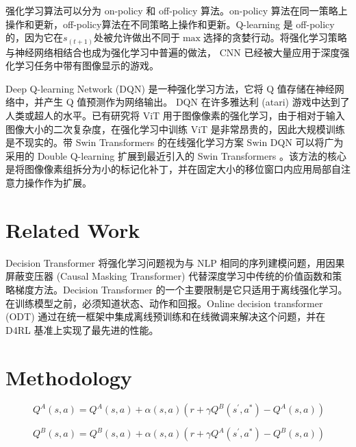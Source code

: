 \documentclass[final,1p,12pt,UTF8,review]{elsarticle}
\begin{document}
\par
强化学习算法可以分为 on-policy 和 off-policy 算法。on-policy 算法在同一策略上操作和更新，off-policy算法在不同策略上操作和更新。Q-learning 是 off-policy 的，因为它在$s_(t+1)$处被允许做出不同于$\max$选择的贪婪行动。将强化学习策略与神经网络相结合也成为强化学习中普遍的做法， CNN 已经被大量应用于深度强化学习任务中带有图像显示的游戏。

\par
Deep Q-learning Network (DQN) 是一种强化学习方法，它将 Q 值存储在神经网络中，并产生 Q 值预测作为网络输出。 DQN 在许多雅达利 (atari) 游戏中达到了人类或超人的水平。已有研究将 ViT 用于图像像素的强化学习，由于相对于输入图像大小的二次复杂度，在强化学习中训练 ViT 是非常昂贵的，因此大规模训练是不现实的。带 Swin Transformers 的在线强化学习方案 Swin DQN 可以将广为采用的 Double Q-learning 扩展到最近引入的 Swin Transformers 。该方法的核心是将图像像素组拆分为小的标记化补丁，并在固定大小的移位窗口内应用局部自注意力操作作为扩展。

\section{Related Work}
Decision Transformer 将强化学习问题视为与 NLP 相同的序列建模问题，用因果屏蔽变压器 (Causal Masking Transformer) 代替深度学习中传统的价值函数和策略梯度方法。Decision Transformer 的一个主要限制是它只适用于离线强化学习。在训练模型之前，必须知道状态、动作和回报。Online decision transformer (ODT) 通过在统一框架中集成离线预训练和在线微调来解决这个问题，并在 D4RL 基准上实现了最先进的性能。
\section{Methodology}

\begin{figure}[htp]
    \begin{equation}
        \label{eq:dqa}
        Q^A(s,a)=Q^A(s,a)+\alpha(s, a)(r+\gamma Q^B(s^{'},a^*)-Q^A(s,a))
    \end{equation}
\end{figure}

\begin{figure}[htp]
    \begin{equation}
        \label{eq:dqb}
        Q^B (s,a) = Q^B (s,a) + \alpha(s, a)(r+\gamma Q^A(s^{'},a^*)-Q^B(s,a))
    \end{equation}
\end{figure}
\end{document}
